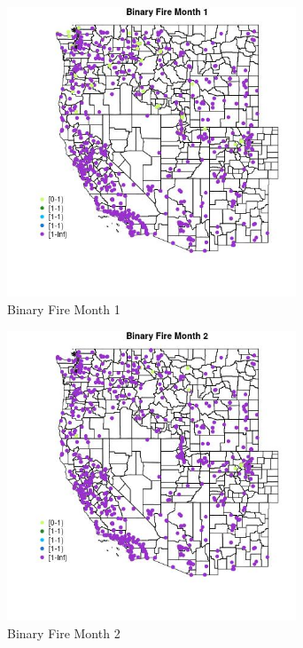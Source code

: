\begin{figure} 
\centering  
\includegraphics[width=0.77\textwidth]{Code_Outputs/Report_ML_input_PM25_Step4_part_f_de_duplicated_aveswNAs_MapObsMo1Binary_Fire.jpg} 
\caption{\label{fig:Report_ML_input_PM25_Step4_part_f_de_duplicated_aveswNAsMapObsMo1Binary_Fire}Binary Fire Month 1} 
\end{figure} 
 

\begin{figure} 
\centering  
\includegraphics[width=0.77\textwidth]{Code_Outputs/Report_ML_input_PM25_Step4_part_f_de_duplicated_aveswNAs_MapObsMo2Binary_Fire.jpg} 
\caption{\label{fig:Report_ML_input_PM25_Step4_part_f_de_duplicated_aveswNAsMapObsMo2Binary_Fire}Binary Fire Month 2} 
\end{figure} 
 

